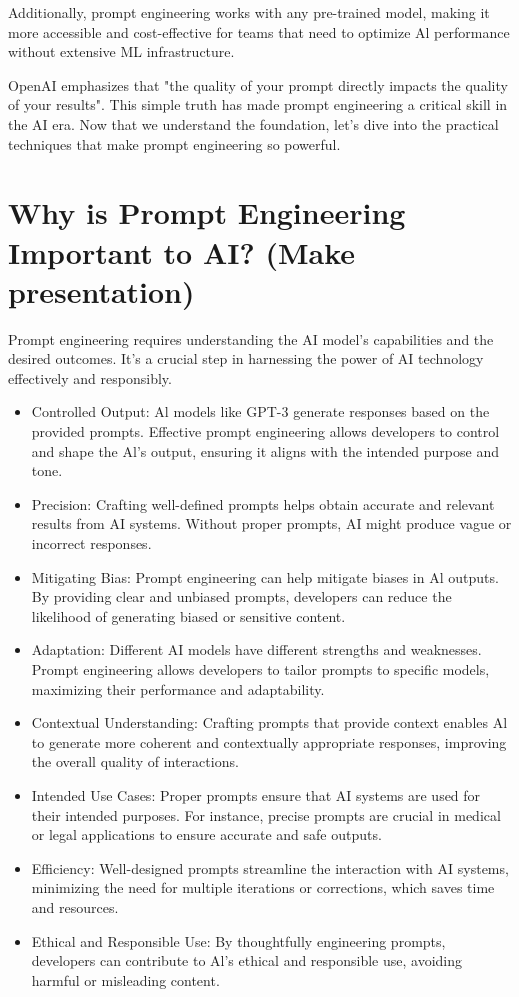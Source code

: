 \documentclass[10pt]{article}
\begin{document}
Additionally, prompt engineering works with any pre-trained model, making it more accessible and cost-effective for teams that need to optimize Al performance without extensive ML infrastructure.

OpenAI emphasizes that "the quality of your prompt directly impacts the quality of your results". This simple truth has made prompt engineering a critical skill in the AI era. Now that we understand the foundation, let's dive into the practical techniques that make prompt engineering so powerful.

\section*{Why is Prompt Engineering Important to AI? (Make presentation)}
Prompt engineering requires understanding the AI model's capabilities and the desired outcomes. It's a crucial step in harnessing the power of AI technology effectively and responsibly.

\begin{itemize}
  \item Controlled Output: Al models like GPT-3 generate responses based on the provided prompts. Effective prompt engineering allows developers to control and shape the Al's output, ensuring it aligns with the intended purpose and tone.
  \item Precision: Crafting well-defined prompts helps obtain accurate and relevant results from AI systems. Without proper prompts, AI might produce vague or incorrect responses.
  \item Mitigating Bias: Prompt engineering can help mitigate biases in Al outputs. By providing clear and unbiased prompts, developers can reduce the likelihood of generating biased or sensitive content.
  \item Adaptation: Different AI models have different strengths and weaknesses. Prompt engineering allows developers to tailor prompts to specific models, maximizing their performance and adaptability.
  \item Contextual Understanding: Crafting prompts that provide context enables Al to generate more coherent and contextually appropriate responses, improving the overall quality of interactions.
  \item Intended Use Cases: Proper prompts ensure that AI systems are used for their intended purposes. For instance, precise prompts are crucial in medical or legal applications to ensure accurate and safe outputs.
  \item Efficiency: Well-designed prompts streamline the interaction with AI systems, minimizing the need for multiple iterations or corrections, which saves time and resources.
  \item Ethical and Responsible Use: By thoughtfully engineering prompts, developers can contribute to Al's ethical and responsible use, avoiding harmful or misleading content.
\end{itemize}
\end{document}
